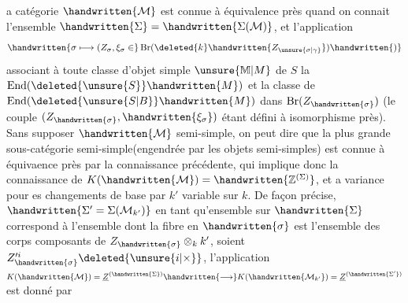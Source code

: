  a catégorie $\handwritten{\mathcal{M}}$ est connue à équivalence près quand on connait l'ensemble $\handwritten{\Sigma}=\handwritten{\Sigma(\mathcal{M})}$, et l'application
\[
\handwritten{\sigma\longmapsto (Z_\sigma,\xi_\sigma\in}\operatorname{Br}(\deleted{k}\handwritten{Z_{\unsure{\sigma|\gamma}}})\handwritten{)}
\]
associant à toute classe d'objet simple $\unsure{\mathbb{M}|M}$ de $S$ la  $\operatorname{End}(\deleted{\unsure{S}}\handwritten{M})$
et la classe de $\operatorname{End}(\deleted{\unsure{S|B}}\handwritten{M})$ dans $\operatorname{Br}(Z_{\handwritten{\sigma}})$ (le couple $(Z_{\handwritten{\sigma}},\handwritten{\xi_\sigma})$ étant défini à isomorphisme près). Sans supposer $\handwritten{\mathcal{M}}$ semi\handwritten{\unsure{(}}-simple, on peut dire que la plus grande sous-catégorie semi-simple(engendrée par les objets semi-simples) est connue à équivaence près par la connaissance précédente, qui implique donc la connaissance de $K(\handwritten{\mathcal{M}})=\handwritten{\mathbb{Z}^{(\Sigma)}}$, et a variance pour es changements de base par $k'$ variable sur $k$. De façon précise,$\handwritten{\Sigma'=\Sigma(\mathcal{M}_{k'})}$ en tant qu'ensemble sur $\handwritten{\Sigma}$ correspond à l'ensemble  dont la fibre  en $\handwritten{\sigma}$ est l'ensemble des corps composants de $Z_{\handwritten{\sigma}}\otimes_k k'$, soient $Z'^{i}_{\handwritten{\sigma}}\deleted{\unsure{i|\times}}$, l'application $K(\handwritten{\mathcal{M}})=\underline{Z}^{(\handwritten{\Sigma})}\handwritten{\longrightarrow}K(\handwritten{\mathcal{M}_{k'}})=\underline{Z}^{(\handwritten{\Sigma'})}$ est donné par

